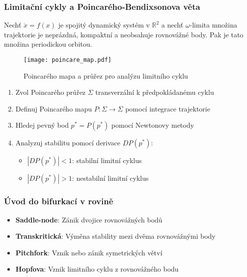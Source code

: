 \subsubsection{Limitační cykly a Poincarého-Bendixsonova věta}

\begin{theorem}
Nechť $\dot{x} = f(x)$ je spojitý dynamický systém v $\mathbb{R}^2$ a nechť $\omega$-limita množina trajektorie je neprázdná, kompaktní a neobsahuje rovnovážné body. Pak je tato množina periodickou orbitou.
\end{theorem}

\begin{figure}[H]
\centering
\texttt{[image: poincare\_map.pdf]}
\caption{Poincarého mapa a průřez pro analýzu limitního cyklu}
\label{fig:poincare_map}
\end{figure}

\begin{application}
\label{app:limit_cycle_detection}
\begin{enumerate}
\item Zvol Poincarého průřez $\Sigma$ transverzální k předpokládanému cyklu
\item Definuj Poincarého mapu $P: \Sigma \to \Sigma$ pomocí integrace trajektorie
\item Hledej pevný bod $p^* = P(p^*)$ pomocí Newtonovy metody
\item Analyzuj stabilitu pomocí derivace $DP(p^*)$:
   \begin{itemize}
   \item $|DP(p^*)| < 1$: stabilní limitní cyklus
   \item $|DP(p^*)| > 1$: nestabilní limitní cyklus
   \end{itemize}
\end{enumerate}
\end{application}

\subsubsection{Úvod do bifurkací v rovině}

\begin{definition}
\begin{itemize}
\item \textbf{Saddle-node}: Zánik dvojice rovnovážných bodů
\item \textbf{Transkritická}: Výměna stability mezi dvěma rovnovážnými body  
\item \textbf{Pitchfork}: Vznik nebo zánik symetrických větví
\item \textbf{Hopfova}: Vznik limitního cyklu z rovnovážného bodu
\end{itemize}
\end{definition}

